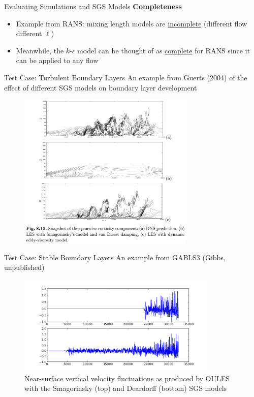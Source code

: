 \begin{frame}{Evaluating Simulations and SGS Models}
\textbf{Completeness}
\begin{itemize}
	\item  Example from RANS: mixing length models are \underline{incomplete} (different flow different $\ell$) 
	\item Meanwhile, the $k$-$\epsilon$ model can be thought of as \underline{complete} for RANS since it can be applied to any flow
\end{itemize}
\end{frame}
\begin{frame}{Test Case: Turbulent Boundary Layers}
An example from Guerts (2004) of the effect of different SGS models on boundary layer development 
\begin{figure}
\includegraphics[width=0.75\textwidth]{compare1}	
\end{figure}

\end{frame}

\begin{frame}{Test Case: Stable Boundary Layers}
An example from GABLS3 (Gibbs, unpublished)
\begin{figure}
\includegraphics[width=0.85\textwidth]{compare23}
~\\Near-surface vertical velocity fluctuations as produced by OULES with the Smagorinsky (top) and Deardorff (bottom) SGS models
\end{figure}

\end{frame}

